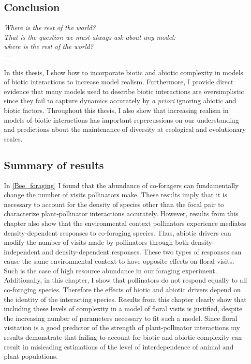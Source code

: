 \begin{refsection}
\chapter{Conclusion} %
\label{Conclusion}
\begin{flushright}{\slshape
    Where is the rest of the world? \\
    That is the question we must always ask about any model: \\
    where is the rest of the world?
    } \\ \medskip
    --- \textcite{levins2006strategies}
\end{flushright}

\bigskip

In this thesis, I show how to incorporate biotic and abiotic complexity in models of biotic interactions to increase model realism. Furthermore, I provide direct evidence that many models used to describe biotic interactions are oversimplistic since they fail to capture dynamics accurately by \textit{a priori} ignoring abiotic and biotic factors. Throughout this thesis, I also show that increasing realism in models of biotic interactions has important repercussions on our understanding and predictions about the maintenance of diversity at ecological and evolutionary scales.

\section*{Summary of results}
In \autoref{Bee_foraging} I found that the abundance of co-foragers can fundamentally change the number of visits pollinators make. These results imply that it is necessary to account for the density of species other than the focal pair to characterize plant-pollinator interactions accurately. However, results from this chapter also show that the environmental context pollinators experience mediates density-dependent responses to co-foraging species. Thus, abiotic drivers can modify the number of visits made by pollinators through both density-independent and density-dependent responses. These two types of responses can cause the same environmental context to have opposite effects on floral visits. Such is the case of high resource abundance in our foraging experiment. Additionally, in this chapter, I show that pollinators do not respond equally to all co-foraging species. Therefore the effects of biotic and abiotic drivers depend on the identity of the interacting species. Results from this chapter clearly show that including these levels of complexity in a model of floral visits is justified, despite the increasing number of parameters necessary to fit such a model. Since floral visitation is a good predictor of the strength of plant-pollinator interactions \citep{vazquez2005interaction, vazquez_strength_2012} my results demonstrate that failing to account for biotic and abiotic complexity can result in misleading estimations of the level of interdependence of animal and plant populations.



\end{refsection}
